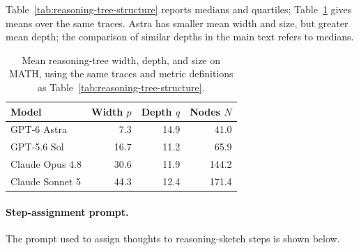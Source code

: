 Table~\ref{tab:reasoning-tree-structure} reports medians and quartiles;
Table~\ref{tab:reasoning-tree-means} gives means over the same traces.
Astra has smaller mean width and size, but greater mean depth; the
comparison of similar depths in the main text refers to medians.

\begin{table}[ht]
\centering
\caption{Mean reasoning-tree width, depth, and size on MATH, using the
same traces and metric definitions as Table~\ref{tab:reasoning-tree-structure}.}
\label{tab:reasoning-tree-means}
\small
\begin{tabular}{lrrr}
\toprule
Model & Width $p$ & Depth $q$ & Nodes $N$ \\
\midrule
GPT-6 Astra & 7.3 & 14.9 & 41.0 \\
GPT-5.6 Sol & 16.7 & 11.2 & 65.9 \\
Claude Opus 4.8 & 30.6 & 11.9 & 144.2 \\
Claude Sonnet 5 & 44.3 & 12.4 & 171.4 \\
\bottomrule
\end{tabular}
\end{table}

\paragraph{Step-assignment prompt.}
The prompt used to assign thoughts to reasoning-sketch steps is shown below.

